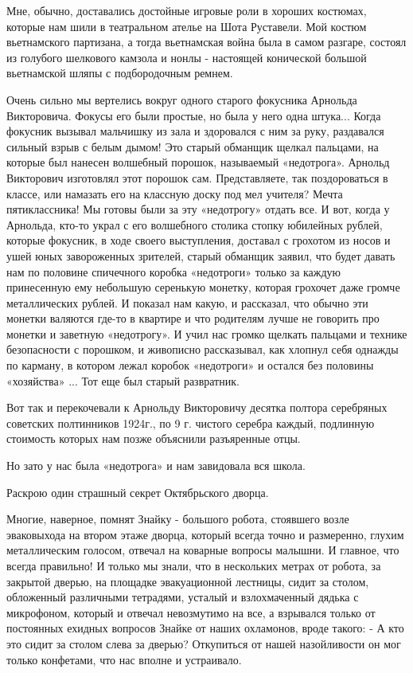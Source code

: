 Мне, обычно, доставались достойные игровые роли в хороших костюмах, которые нам
шили в театральном ателье на Шота Руставели. Мой костюм вьетнамского партизана,
а тогда вьетнамская война была в самом разгаре, состоял из голубого шелкового
камзола и нонлы - настоящей конической большой вьетнамской шляпы с
подбородочным ремнем.

Очень сильно мы вертелись вокруг одного старого фокусника Арнольда Викторовича.
Фокусы его были простые, но была у него одна штука... Когда фокусник вызывал
мальчишку из зала и здоровался с ним за руку, раздавался сильный взрыв с белым
дымом! Это старый обманщик щелкал пальцами, на которые был нанесен волшебный
порошок, называемый «недотрога». Арнольд Викторович изготовлял этот порошок
сам. Представляете, так поздороваться в классе, или намазать его на классную
доску под мел учителя? Мечта пятиклассника! Мы готовы были за эту «недотрогу»
отдать все.  И вот, когда у Арнольда, кто-то украл с его волшебного столика
стопку юбилейных рублей, которые фокусник, в ходе своего выступления, доставал
с грохотом из носов и ушей юных завороженных зрителей, старый обманщик заявил,
что будет давать нам по половине спичечного коробка «недотроги» только за
каждую принесенную ему небольшую серенькую монетку, которая грохочет даже
громче металлических рублей. И показал нам какую, и рассказал, что обычно эти
монетки валяются где-то в квартире и что родителям лучше не говорить про
монетки и заветную «недотрогу». И учил нас громко щелкать пальцами и технике
безопасности с порошком, и живописно рассказывал, как хлопнул себя однажды по
карману, в котором лежал коробок «недотроги» и остался без половины «хозяйства»
...  Тот еще был старый развратник.

Вот так и перекочевали к Арнольду Викторовичу десятка полтора серебряных
советских полтинников 1924г., по 9 г. чистого серебра каждый, подлинную
стоимость которых нам позже объяснили разъяренные отцы. 

Но зато у нас была «недотрога» и нам завидовала вся школа.

Раскрою один страшный секрет Октябрьского дворца.

Многие, наверное, помнят Знайку - большого робота, стоявшего возле эваковыхода
на втором этаже дворца, который всегда точно и размеренно, глухим металлическим
голосом, отвечал на коварные вопросы малышни. И главное, что всегда правильно!
И только мы знали, что в нескольких метрах от робота, за закрытой дверью, на
площадке эвакуационной лестницы, сидит за столом, обложенный различными
тетрадями, усталый и взлохмаченный дядька с микрофоном, который и отвечал
невозмутимо на все, а взрывался только от постоянных ехидных вопросов Знайке от
наших охламонов, вроде такого: - А кто это сидит за столом слева за дверью?
Откупиться от нашей назойливости он мог только конфетами, что нас вполне и
устраивало.

